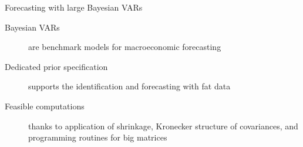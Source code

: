 \documentclass[notes,blackandwhite,mathsans,usenames,dvipsnames]{beamer}
\begin{document}
{
\begin{frame}{\color{mcxs1}Forecasting with large Bayesian VARs}
\begin{description}
\item[Bayesian VARs] {\color{mcxs5}are benchmark models for macroeconomic forecasting}

\bigskip\item[Dedicated prior specification] {\color{mcxs5}supports the identification and forecasting with fat data}

\bigskip\item[Feasible computations] {\color{mcxs5}thanks to application of shrinkage, Kronecker structure of covariances, and programming routines for big matrices}
\end{description}
\end{frame}
}
\end{document}
